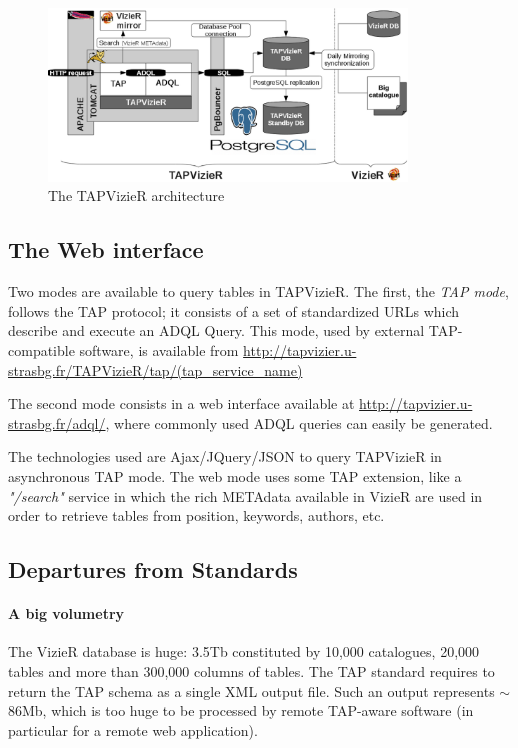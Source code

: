 \begin{figure}[hbp] \center
\includegraphics[width=0.85\textwidth]{part8/Landais_P44/P044_fig1.eps}
\caption{The TAPVizieR architecture}\label{P044:architecture}
\end{figure}

\subsection{The Web interface}
\label{P044:web_interface}
Two modes are available to query tables in TAPVizieR.
The first, the {\em TAP mode}, 
follows the TAP protocol; it consists of a set of standardized URLs
which
describe and execute an ADQL Query. This mode, used by external TAP-compatible
software, is available from
{\small\url{http://tapvizier.u-strasbg.fr/TAPVizieR/tap/(tap_service_name)}}

The second mode consists in a web interface  
available at {\small\url{http://tapvizier.u-strasbg.fr/adql/}}, where
commonly used ADQL queries can easily be generated.

The technologies used are Ajax/JQuery/JSON to query TAPVizieR in asynchronous 
TAP mode. The web mode uses some TAP extension, like a \textit{"/search"} service
in which the rich METAdata available in VizieR are used in order to retrieve tables 
from position, keywords, authors, etc.


\subsection{Departures from Standards}

\paragraph{A big volumetry}

The VizieR database is huge:  3.5Tb constituted by 10,000 catalogues, 20,000
tables and more than 300,000 columns of tables. The TAP standard requires
to return the TAP schema as a single XML output file. Such an output represents
$\sim$86Mb, which is too huge to be processed by remote TAP-aware
software (in 
particular for a remote web application).

